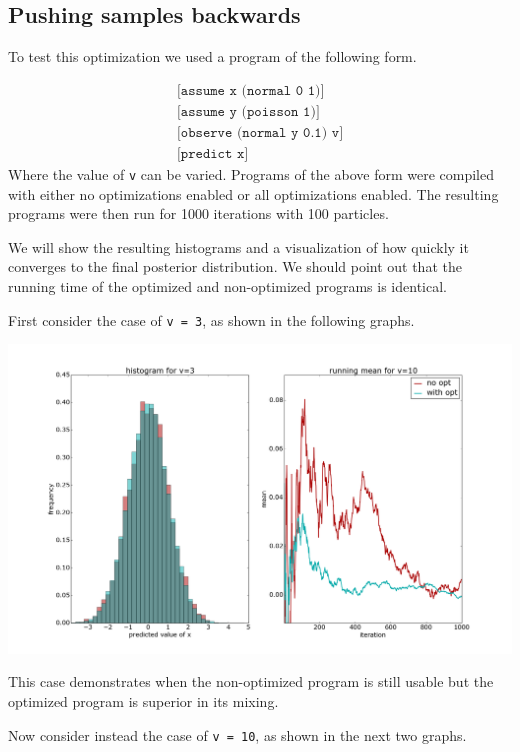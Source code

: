 \documentclass[a4paper]{article}
\begin{document}
\subsection{Pushing samples backwards}

To test this optimization we used a program of the following form.

\[
	\begin{array}{l}
		\texttt{[assume x (normal 0 1)]} \\
		\texttt{[assume y (poisson 1)]} \\
		\texttt{[observe (normal y 0.1) v]} \\
		\texttt{[predict x]}
	\end{array}
\]
Where the value of \texttt{v} can be varied. Programs of the above form were compiled with either no optimizations enabled or all optimizations enabled. The resulting programs were then run for 1000 iterations with 100 particles.

We will show the resulting histograms and a visualization of how quickly it converges to the final posterior distribution. We should point out that the running time of the optimized and non-optimized programs is identical.

First consider the case of \texttt{v = 3}, as shown in the following graphs.

\centerline{\includegraphics[width=16cm]{images/pushing_samples_back_1.png}}

This case demonstrates when the non-optimized program is still usable but the optimized program is superior in its mixing.

Now consider instead the case of \texttt{v = 10}, as shown in the next two graphs.
\end{document}
